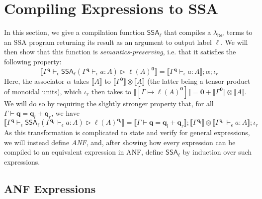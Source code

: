 \documentclass[acmsmall,screen,review]{acmart}
\newcounter{todos}
\newcommand{\TODO}[1]{{
  \stepcounter{todos}
  \begin{center}\large{\textcolor{red}{\textbf{TODO \arabic{todos}:} #1}}\end{center}
}}
\newcommand{\mb}[1]{\ensuremath{\mathbf{#1}}}
\newcommand{\ms}[1]{\ensuremath{\mathsf{#1}}}
\newcommand{\lto}{:}
\newcommand{\wbranch}[3]{#1(#2) \lto \{#3\}}
\newcommand{\qsp}[4]{#1 \vdash #2 = #3 + #4}
\newcommand{\hasty}[4]{#1 \vdash_{#2} #3: {#4}}
\newcommand{\haslb}[4]{#1 \vdash_{#2} #3 \rhd #4}
\newcommand{\tossa}[2]{\ms{SSA}_{#1}(#2)}
\newcommand{\ltoty}[2]{[#1 \mapsto #2]}
\newcommand{\dnt}[1]{\llbracket{#1}\rrbracket}
\newcommand{\subiterexp}{\texorpdfstring{\(\lambda_{\ms{iter}}\)}{lambda-iter}}
\newcommand{\isotopessa}{\(\lambda_{\ms{SSA}}\)}
\begin{document}



\section{Compiling Expressions to SSA}

\label{apx:ssa-roundtrip}

In this section, we give a compilation function $\ms{SSA}_\ell$ that compiles a \subiterexp{} terms 
to an SSA program returning its result as an argument to output label $\ell$. We will then show
that this function is \emph{semantics-preserving}, i.e. that it satisfies the following property:
$$
\dnt{
  \haslb{\Gamma^{\mb{q}}}{\epsilon}{\tossa{\ell}{\hasty{\Gamma^{\mb{q}}}{\epsilon}{a}{A}}}
  {\ell(A)^{\mb{0}}}
} = \dnt{\hasty{\Gamma^{\mb{q}}}{\epsilon}{a}{A}} ; \alpha ; \iota_r
$$
Here, the associator $\alpha$ takes $\dnt{A}$ to $\dnt{\Gamma^{\mb{0}}} \otimes \dnt{A}$ (the latter
being a tensor product of monoidal units), which $\iota_r$ then takes to
$\dnt{\ltoty{\Gamma}{\ell(A)^{\mb{0}}}} = \mb{0} + \dnt{\Gamma^{\mb{0}}} \otimes \dnt{A}$. We will
do so by requiring the slightly stronger property that, for all
$\qsp{\Gamma}{\mb{q}}{\mb{q}_l}{\mb{q}_r}$, we have
$$
  \dnt{
    \haslb{\Gamma^{\mb{q}}}{\epsilon}{\tossa{\ell}{\hasty{\Gamma^{\mb{q}_r}}{\epsilon}{a}{A}}}
    {\ell(A)^{\mb{q}_l}}
  } 
  = \dnt{\qsp{\Gamma}{\mb{q}}{\mb{q}_l}{\mb{q}_r}}
  ; \dnt{\Gamma^{\mb{q}_l}} \otimes \dnt{\hasty{\Gamma^{\mb{q}_r}}{\epsilon}{a}{A}} 
  ; \iota_r
$$ 
As this transformation is complicated to state and verify for general expressions, we will instead
define \emph{ANF}, and, after showing how every expression can be compiled to an equivalent
expression in ANF, define $\ms{SSA}_\ell$ by induction over such expressions.

\subsection{ANF Expressions}
\end{document}
